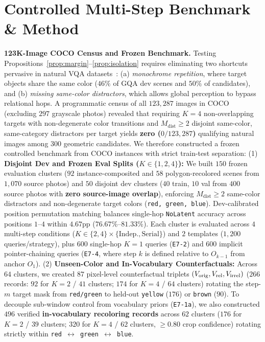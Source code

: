 \section{Controlled Multi-Step Benchmark \& Method}
\label{sec:benchmark}

\textbf{123K-Image COCO Census and Frozen Benchmark.}
\label{subsec:census}
Testing Propositions~\ref{prop:margin}--\ref{prop:isolation} requires eliminating two shortcuts pervasive in natural VQA datasets~\cite{hudson2019gqa,lin2014coco}: (a) \emph{monochrome repetition}, where target objects share the same color ($46\%$ of GQA dev scenes and $50\%$ of candidates), and (b) \emph{missing same-color distractors}, which allows global perception to bypass relational hops. A programmatic census of all $123,287$ images in COCO~\cite{lin2014coco} (excluding $297$ grayscale photos) revealed that requiring $K=4$ non-overlapping targets with non-degenerate color transitions and $M_{\mathrm{dist}} \ge 2$ disjoint same-color, same-category distractors per target yields \textbf{zero ($0 / 123,287$)} qualifying natural images among $300$ geometric candidates. We therefore constructed a frozen controlled benchmark from COCO instances with strict train-test separation:
(1) \textbf{Disjoint Dev and Frozen Eval Splits ($K \in \{1, 2, 4\}$):} We built $150$ frozen evaluation clusters ($92$ instance-composited and $58$ polygon-recolored scenes from $1,070$ source photos) and $50$ disjoint dev clusters ($40$ train, $10$ val from $400$ source photos with \textbf{zero source-image overlap}), enforcing $M_{\mathrm{dist}} \ge 2$ same-color distractors and non-degenerate target colors (\texttt{red, green, blue}). Dev-calibrated position permutation matching balances single-hop \texttt{NoLatent} accuracy across positions $1$--$4$ within $4.67$pp ($76.67\%$--$81.33\%$). Each cluster is evaluated across $4$ multi-step conditions ($K \in \{2, 4\} \times \{\text{Indep.}, \text{Serial}\}$) and $2$ templates ($1,200$ queries/strategy), plus $600$ single-hop $K=1$ queries (\texttt{E7-2}) and $600$ implicit pointer-chaining queries (\texttt{E7-4}, where step $k$ is defined relative to $O_{k-1}$ from anchor $O_1$).
(2) \textbf{Unseen-Color and In-Vocabulary Counterfactuals:} Across $64$ clusters, we created $87$ pixel-level counterfactual triplets $(V_{\mathrm{orig}}, V_{\mathrm{rel}}, V_{\mathrm{irrel}})$ ($266$ records: $92$ for $K=2$ / $41$ clusters; $174$ for $K=4$ / $64$ clusters) rotating the step-$m$ target mask from \texttt{red/green} to held-out \texttt{yellow} ($176$) or \texttt{brown} ($90$). To decouple sub-window control from vocabulary priors (\texttt{E7-1a}), we also constructed $496$ verified \textbf{in-vocabulary recoloring records} across $62$ clusters ($176$ for $K=2$ / $39$ clusters; $320$ for $K=4$ / $62$ clusters, $\ge 0.80$ crop confidence) rotating strictly within \texttt{red $\leftrightarrow$ green $\leftrightarrow$ blue}.

